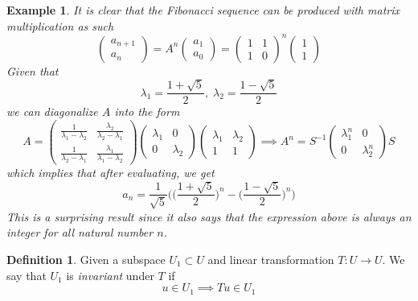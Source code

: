 \documentclass{article}
\newtheorem{example}{Example}[section]
\theoremstyle{remark}
\theoremstyle{definition}
\newtheorem{definition}{Definition}[section]
\begin{document}
    \begin{example}
    It is clear that the Fibonacci sequence can be produced with matrix multiplication as such 
    \[ \begin{pmatrix}
    a_{n+1} \\ a_n
    \end{pmatrix} = A^n \begin{pmatrix}
    a_1 \\ a_0
    \end{pmatrix} = \begin{pmatrix}
    1&1\\1&0
    \end{pmatrix}^n \begin{pmatrix}
    1\\1
    \end{pmatrix}\]
    Given that 
    \[\lambda_1 = \frac{1+\sqrt{5}}{2}, \; \lambda_2 = \frac{1 - \sqrt{5}}{2}\]
    we can diagonalize $A$ into the form 
    \[A = \begin{pmatrix}
    \frac{1}{\lambda_1 - \lambda_2} & \frac{\lambda_2}{\lambda_2 - \lambda_1} \\
    \frac{1}{\lambda_2 - \lambda_1} & \frac{\lambda_1}{\lambda_1 - \lambda_2}
    \end{pmatrix} \begin{pmatrix}
    \lambda_1 & 0 \\ 0 & \lambda_2 
    \end{pmatrix} \begin{pmatrix}
    \lambda_1 & \lambda_2 \\
    1 & 1
    \end{pmatrix} \implies A^n = S^{-1} \begin{pmatrix}
    \lambda_1^n & 0 \\ 0 & \lambda_2^n 
    \end{pmatrix} S\]
    which implies that after evaluating, we get 
    \[ a_n = \frac{1}{\sqrt{5}} \bigg( \Big(\frac{1+\sqrt{5}}{2}\Big)^n - \Big(\frac{1-\sqrt{5}}{2}\Big)^n \bigg)\]
    This is a surprising result since it also says that the expression above is always an integer for all natural number $n$. 
    \end{example}
    \begin{definition}
    Given a subspace $U_1 \subset U$ and linear transformation $T: U \longrightarrow U$. We say that $U_1$ is \textit{invariant} under $T$ if 
    \[u \in U_1 \implies T u \in U_1\]
    \end{definition}
\end{document}
